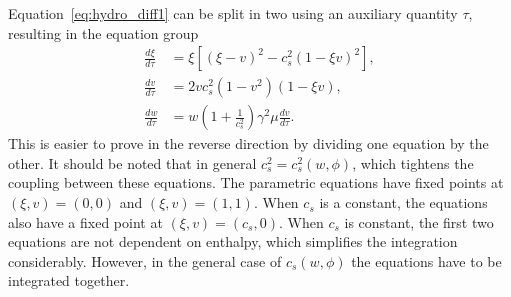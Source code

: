 Equation~\eqref{eq:hydro_diff1} can be split in two using an auxiliary quantity $\tau$,
resulting in the equation group
\cite[eq. B.14-16]{hindmarsh_gw_pt_2019}
\begin{align}
\frac{d\xi}{d\tau} &= \xi \left[ (\xi - v)^2 - c_s^2 (1 - \xi v)^2 \right],
\label{eq:hydro_param1} \\
\frac{dv}{d\tau} &= 2 v c_s^2 (1 - v^2) (1 - \xi v),
\label{eq:hydro_param2} \\
\frac{dw}{d\tau} &= w \left( 1 + \frac{1}{c_s^2} \right) \gamma^2 \mu \frac{dv}{d\tau}.
\label{eq:hydro_param3}
\end{align}
This is easier to prove in the reverse direction by dividing one equation by the other.
It should be noted that in general $c_s^2 = c_s^2(w,\phi)$, which tightens the coupling between these equations.
The parametric equations have fixed points at
$(\xi,v) = (0,0)$ and
$(\xi,v) = (1,1)$.
When $c_s$ is a constant, the equations also have a fixed point at
$(\xi,v) = (c_s,0)$.
When $c_s$ is constant, the first two equations are not dependent on enthalpy, which simplifies the integration considerably.
However, in the general case of $c_s(w,\phi)$ the equations have to be integrated together.
